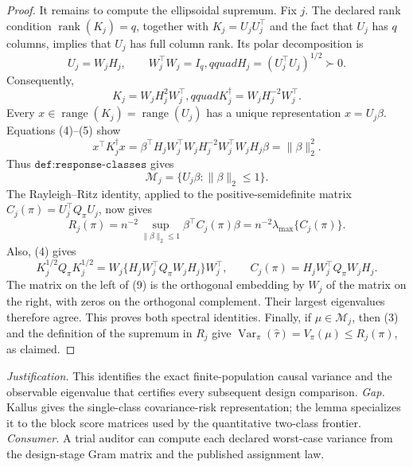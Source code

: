 \documentclass{article}
\begin{document}
\begin{proof}
It remains to compute the ellipsoidal supremum.  Fix \(j\).  The declared rank condition \(\operatorname{rank}(K_j)=q\), together with \(K_j=U_jU_j^\top\) and the fact that \(U_j\) has \(q\) columns, implies that \(U_j\) has full column rank.  Its polar decomposition is
\[
U_j=W_jH_j,\qquad W_j^\top W_j=I_q,qquad H_j=(U_j^\top U_j)^{1/2}\succ0. \tag{4}
\]
Consequently,
\[
K_j=W_jH_j^2W_j^\top,qquad
K_j^\dagger=W_jH_j^{-2}W_j^\top. \tag{5}
\]
Every \(x\in\operatorname{range}(K_j)=\operatorname{range}(U_j)\) has a unique representation \(x=U_j\beta\).  Equations (4)--(5) show
\[
x^\top K_j^\dagger x
=\beta^\top H_jW_j^\top W_jH_j^{-2}W_j^\top W_jH_j\beta
=\|\beta\|_2^2. \tag{6}
\]
Thus \(\texttt{def:response-classes}\) gives
\[
\mathcal M_j=\{U_j\beta:\|\beta\|_2\le1\}. \tag{7}
\]
The Rayleigh--Ritz identity, applied to the positive-semidefinite matrix \(C_j(\pi)=U_j^\top Q_\pi U_j\), now gives
\[
R_j(\pi)
=n^{-2}\sup_{\|\beta\|_2\le1}\beta^\top C_j(\pi)\beta
=n^{-2}\lambda_{\max}\{C_j(\pi)\}. \tag{8}
\]
Also, (4) gives
\[
K_j^{1/2}Q_\pi K_j^{1/2}
=W_j\{H_jW_j^\top Q_\pi W_jH_j\}W_j^\top,
\qquad
C_j(\pi)=H_jW_j^\top Q_\pi W_jH_j. \tag{9}
\]
The matrix on the left of (9) is the orthogonal embedding by \(W_j\) of the matrix on the right, with zeros on the orthogonal complement.  Their largest eigenvalues therefore agree.  This proves both spectral identities.  Finally, if \(\mu\in\mathcal M_j\), then (3) and the definition of the supremum in \(R_j\) give \(\operatorname{Var}_\pi(\widehat\tau)=V_\pi(\mu)\le R_j(\pi)\), as claimed.
\end{proof}
\par\smallskip\noindent \textit{Justification.} This identifies the exact finite-population causal variance and the observable eigenvalue that certifies every subsequent design comparison. \textit{Gap.} Kallus gives the single-class covariance-risk representation; the lemma specializes it to the block score matrices used by the quantitative two-class frontier. \textit{Consumer.} A trial auditor can compute each declared worst-case variance from the design-stage Gram matrix and the published assignment law.
\end{document}
